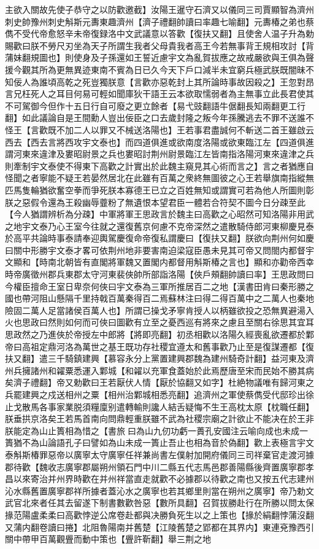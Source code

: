 主欲入關故先使子恭守之以防歡邀截】汝陽王暹守石濟又以儀同三司賈顯智為濟州刺史帥豫州刺史斛斯元夀東趣濟州【濟子禮翻帥讀曰率趣七喻翻】元夀椿之弟也蔡儁不受代帝愈怒辛未帝復録洛中文武議意以答歡【復扶又翻】且使舍人温子升為勅賜歡曰朕不勞尺刃坐為天子所謂生我者父母貴我者高王今若無事背王規相攻討【背蒲妹翻規圖也】則使身及子孫還如王誓近慮宇文為亂賀拔應之故戒嚴欲與王俱為聲援今觀其所為更無異迹東南不賓為日已久今天下戶口減半未宜窮兵極武朕既闇昧不知佞人為誰頃高乾之死豈獨朕意【言歡亦惡乾封上其所論時事故因殺之】王忽對昂言兄枉死人之耳目何易可輕如聞庫狄干語王云本欲取懦弱者為主無事立此長君使其不可駕御今但作十五日行自可廢之更立餘者【易弋豉翻語牛倨翻長知兩翻更工行翻】如此議論自是王間勳人豈出佞臣之口去歲封隆之叛今年孫騰逃去不罪不送誰不怪王【言歡既不加二人以罪又不械送洛陽也】王若事君盡誠何不斬送二首王雖啟云西去【西去言將西攻宇文泰也】而四道俱進或欲南度洛陽或欲東臨江左【四道俱進謂河東來違津及婁昭尉景之兵也婁昭討荆州尉景臨江左皆南指洛陽河東來違津之兵則牽制宇文泰使不得東下高歡之計實出於此魏主窺見其心術而言之】言之者猶應自怪聞之者寧能不疑王若晏然居北在此雖有百萬之衆終無圖彼之心王若舉旗南指縱無匹馬隻輪猶欲奮空拳而爭死朕本寡德王已立之百姓無知或謂實可若為他人所圖則彰朕之惡假令還為王殺幽辱虀粉了無遺恨本望君臣一體若合符契不圖今日分疎至此【今人猶謂辨析為分疎】中軍將軍王思政言於魏主曰高歡之心昭然可知洛陽非用武之地宇文泰乃心王室今往就之還復舊京何慮不克帝深然之遣散騎侍郎河東柳慶見泰於高平共論時事泰請奉迎輿駕慶復命帝復私謂慶曰【復扶又翻】朕欲向荆州何如慶曰關中形勝宇文泰才畧可依荆州地非要害南迫梁寇臣愚未見其可帝又問閤内都督宇文顯和【時南北朝皆有直閣將軍魏又置閣内都督用斛斯椿之言也】顯和亦勸帝西幸時帝廣徵州郡兵東郡太守河東裴俠帥所部詣洛陽【俠戶頰翻帥讀曰率】王思政問曰今權臣擅命王室日卑奈何俠曰宇文泰為三軍所推居百二之地【漢書田肯曰秦形勝之國也帶河阻山懸隔千里持戟百萬秦得百二焉蘇林注曰得二得百萬中之二萬人也秦地險固二萬人足當諸侯百萬人也】所謂已操戈矛寧肯授人以柄雖欲投之恐無異避湯入火也思政曰然則如何而可俠曰圖歡有立至之憂西巡有將來之慮且至關右徐思其宜耳思政然之乃進俠於帝授左中郎將【將即亮翻】初丞相歡以洛陽久經喪亂欲遷都於鄴帝曰高祖定鼎河洛為萬世之基王既功存社稷宜遵太和舊事歡乃止至是復謀遷都【復扶又翻】遣三千騎鎮建興【慕容永分上黨置建興郡魏為建州騎奇計翻】益河東及濟州兵擁諸州和糴粟悉運入鄴城【和糴以充軍食蓋始於此焉歷唐至宋而民始不勝其病矣濟子禮翻】帝又勅歡曰王若厭伏人情【厭於協翻又如字】杜絶物議唯有歸河東之兵罷建興之戍送相州之粟【相州治鄴城相悉亮翻】追濟州之軍使蔡儁受代邸珍出徐止戈散馬各事家業脱須糧廩别遣轉輸則讒人結舌疑悔不生王高枕太原【枕職任翻】朕垂拱京洛矣王若馬首南向問鼎輕重朕雖不武為社稷宗廟之計欲止不能决在於王非朕能定為山止簣相為惜之【書旅曰為山九仞功虧一蕢孔安國注云喻向成也未成一簣猶不為山論語孔子曰譬如為山未成一簣止吾止也相為音於偽翻】歡上表極言宇文泰斛斯椿罪惡帝以廣寧太守廣寧任祥兼尚書左僕射加開府儀同三司祥棄官走渡河據郡待歡【魏收志廣寧郡屬朔州領石門中川二縣五代志馬邑郡善陽縣後齊置廣寧郡孝昌以來寄治并州界時歡在并州祥當直走就歡不必據郡以待歡之南也又按五代志建州沁水縣舊置廣寧郡祥所據者蓋沁水之廣寧也若其鄉里則當在朔州之廣寧】帝乃勅文武官北來者任其去留遂下制書數歡咎惡【數所具翻】召賀拔勝赴行在所勝以問太保掾范陽盧柔柔曰高歡悖逆公席卷赴都與决勝負死生以之上策也【掾於絹翻悖蒲沒翻又蒲内翻卷讀曰捲】北阻魯陽南并舊楚【江陵舊楚之郢都在其界内】東連兗豫西引關中帶甲百萬觀舋而動中策也【舋許靳翻】舉三荆之地